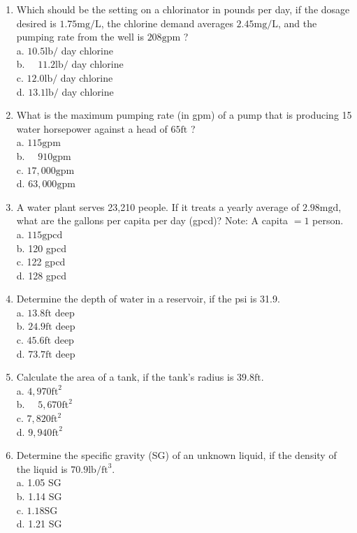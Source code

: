 \documentclass[10pt]{article}
\begin{document}
\begin{enumerate}
  \item Which should be the setting on a chlorinator in pounds per day, if the dosage desired is $1.75 \mathrm{mg} / \mathrm{L}$, the chlorine demand averages $2.45 \mathrm{mg} / \mathrm{L}$, and the pumping rate from the well is $208 \mathrm{gpm}$ ?\\
a. $10.5 \mathrm{lb} /$ day chlorine\\
b. $\quad 11.2 \mathrm{lb} /$ day chlorine\\
c. $12.0 \mathrm{lb} /$ day chlorine\\
d. $13.1 \mathrm{lb} /$ day chlorine

  \item What is the maximum pumping rate (in gpm) of a pump that is producing 15 water horsepower against a head of $65 \mathrm{ft}$ ?\\
a. $115 \mathrm{gpm}$\\
b. $\quad 910 \mathrm{gpm}$\\
c. $17,000 \mathrm{gpm}$\\
d. $63,000 \mathrm{gpm}$

  \item A water plant serves 23,210 people. If it treats a yearly average of $2.98 \mathrm{mgd}$, what are the gallons per capita per day (gpcd)? Note: A capita $=1$ person.\\
a. $115 \mathrm{gpcd}$\\
b. 120 gpcd\\
c. 122 gpcd\\
d. 128 gpcd

  \item Determine the depth of water in a reservoir, if the psi is 31.9.\\
a. $13.8 \mathrm{ft}$ deep\\
b. $24.9 \mathrm{ft}$ deep\\
c. $45.6 \mathrm{ft}$ deep\\
d. $73.7 \mathrm{ft}$ deep

  \item Calculate the area of a tank, if the tank's radius is $39.8 \mathrm{ft}$.\\
a. $4,970 \mathrm{ft}^{2}$\\
b. $\quad 5,670 \mathrm{ft}^{2}$\\
c. $7,820 \mathrm{ft}^{2}$\\
d. $9,940 \mathrm{ft}^{2}$

  \item Determine the specific gravity (SG) of an unknown liquid, if the density of the liquid is $70.9 \mathrm{lb} / \mathrm{ft}^{3}$.\\
a. 1.05 SG\\
b. 1.14 SG\\
c. $1.18 \mathrm{SG}$\\
d. 1.21 SG


\end{enumerate}
\end{document}
